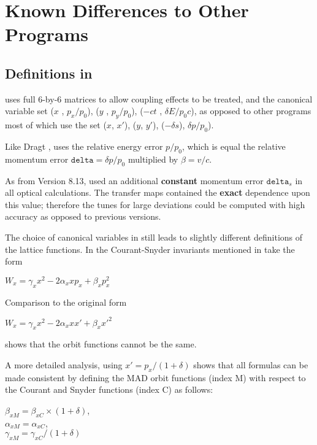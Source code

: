 
\chapter{Known Differences to Other Programs}
\label{chap:differences}

\section{Definitions in \madeight}
\label{sec:mad8-definitions}

\madeight uses full 6-by-6 matrices to allow coupling effects to be treated,
and the canonical variable set ($x$ , $p_x / p_0$),
($y$ , $p_y / p_0$), ($-ct$ , $\delta E / p_0 c$), as opposed to other
programs most of which use the set ($x$, $x'$), ($y$, $y'$),
($-\delta s$), $\delta p / p_0$).

Like Dragt \cite{dragt1982}, \madeight uses the relative
energy error $p / p_0$, which is equal the relative momentum error
$\mathtt{delta} = \delta p / p_0$ multiplied by $\beta = v/c$.

As from Version 8.13, \madeight used an additional \textbf{constant}
momentum error $\mathtt{delta}_s$ in all optical calculations. 
The transfer maps contained the \textbf{exact} dependence upon this
value; therefore the tunes for large deviations could be computed with
high accuracy as opposed to previous versions.

The choice of canonical variables in \madx still leads to slightly
different definitions of the lattice functions. In \madx the
Courant-Snyder invariants mentioned in \cite{Courant-Snyder1958} take
the form

$W_x = \gamma_x x^2 - 2 \alpha_x x p_x + \beta_x  p_x^2$

Comparison to the original form 

$W_x = \gamma_x x^2 - 2 \alpha_x x x' + \beta_x  {x'}^2$

shows that the orbit functions cannot be the same.

A more detailed analysis, using 
$x' = p_x / (1 + \delta)$
shows that all formulas can be made consistent by defining the MAD orbit
functions (index M) with respect to the Courant and Snyder functions
(index C) as follows: 

$\beta_{xM} = \beta_{xC} \times (1 + \delta)$, \\
$\alpha_{xM} = \alpha_{xC}$, \\
$\gamma_{xM} = \gamma_{xC} / (1 + \delta)$

